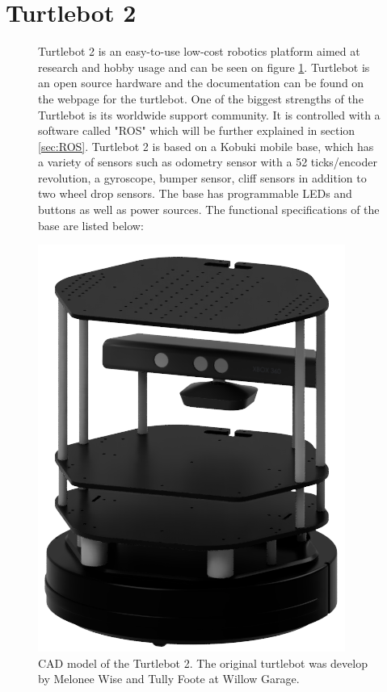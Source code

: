 \section{Turtlebot 2}


\begin{figure}[H]
    \centering
    \begin{minipage}[b]{0.56\linewidth}
     Turtlebot 2 is an easy-to-use low-cost robotics platform aimed at research and hobby usage and can be seen on figure \ref{fig:turtlebot2}\cite{turtlebot2Kobuki}. 
     Turtlebot is an open source hardware and the documentation can be found on the webpage for the turtlebot. One of the biggest strengths of the Turtlebot is its worldwide support community\cite{turtlebotworld}. It is controlled with a software called "ROS" which will be further explained in section \ref{sec:ROS}.
     Turtlebot 2 is based on a Kobuki mobile base, which has a variety of sensors such as odometry sensor with a 52 ticks/encoder revolution, a gyroscope, bumper sensor, cliff sensors in addition to two wheel drop sensors. The base has programmable LEDs and buttons as well as power sources. The functional specifications of the base are listed below:
    \end{minipage}
    \hspace{0.3cm}
    \begin{minipage}[b]{0.33\linewidth}
    \centering
    \includegraphics[width=\textwidth]{figures/turtlebot_2.png}
    \caption{CAD model of the Turtlebot 2\cite{TURTLE_build}. The original turtlebot was develop by Melonee Wise and Tully Foote at Willow Garage\cite{TURTLE_devs}.}
    \label{fig:turtlebot2}
    \end{minipage}
\end{figure}
